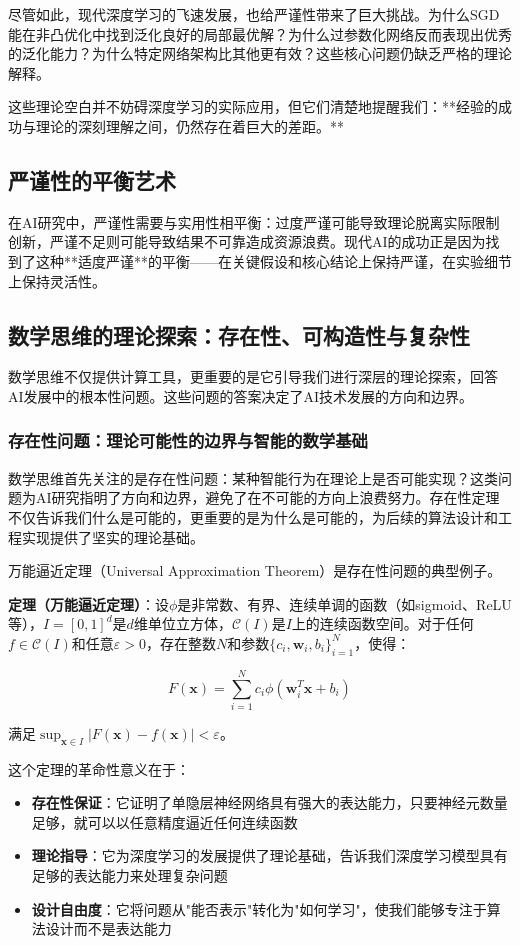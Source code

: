尽管如此，现代深度学习的飞速发展，也给严谨性带来了巨大挑战。为什么SGD能在非凸优化中找到泛化良好的局部最优解？为什么过参数化网络反而表现出优秀的泛化能力？为什么特定网络架构比其他更有效？这些核心问题仍缺乏严格的理论解释。

这些理论空白并不妨碍深度学习的实际应用，但它们清楚地提醒我们：**经验的成功与理论的深刻理解之间，仍然存在着巨大的差距。**

\subsection*{严谨性的平衡艺术}

在AI研究中，严谨性需要与实用性相平衡：过度严谨可能导致理论脱离实际限制创新，严谨不足则可能导致结果不可靠造成资源浪费。现代AI的成功正是因为找到了这种**适度严谨**的平衡——在关键假设和核心结论上保持严谨，在实验细节上保持灵活性。

\subsection{数学思维的理论探索：存在性、可构造性与复杂性}

数学思维不仅提供计算工具，更重要的是它引导我们进行深层的理论探索，回答AI发展中的根本性问题。这些问题的答案决定了AI技术发展的方向和边界。

\subsubsection{存在性问题：理论可能性的边界与智能的数学基础}

数学思维首先关注的是存在性问题：某种智能行为在理论上是否可能实现？这类问题为AI研究指明了方向和边界，避免了在不可能的方向上浪费努力。存在性定理不仅告诉我们什么是可能的，更重要的是为什么是可能的，为后续的算法设计和工程实现提供了坚实的理论基础。

万能逼近定理（Universal Approximation Theorem）是存在性问题的典型例子。

\textbf{定理（万能逼近定理）}：设$\phi$是非常数、有界、连续单调的函数（如sigmoid、ReLU等），$I = [0,1]^d$是$d$维单位立方体，$\mathcal{C}(I)$是$I$上的连续函数空间。对于任何$f \in \mathcal{C}(I)$和任意$\varepsilon > 0$，存在整数$N$和参数$\{c_i, \mathbf{w}_i, b_i\}_{i=1}^N$，使得：

$$F(\mathbf{x}) = \sum_{i=1}^{N} c_i \phi(\mathbf{w}_i^T\mathbf{x} + b_i)$$

满足$\sup_{\mathbf{x} \in I} |F(\mathbf{x}) - f(\mathbf{x})| < \varepsilon$。

这个定理的革命性意义在于：
\begin{itemize}
\item \textbf{存在性保证}：它证明了单隐层神经网络具有强大的表达能力，只要神经元数量足够，就可以以任意精度逼近任何连续函数
\item \textbf{理论指导}：它为深度学习的发展提供了理论基础，告诉我们深度学习模型具有足够的表达能力来处理复杂问题
\item \textbf{设计自由度}：它将问题从"能否表示"转化为"如何学习"，使我们能够专注于算法设计而不是表达能力
\end{itemize}

